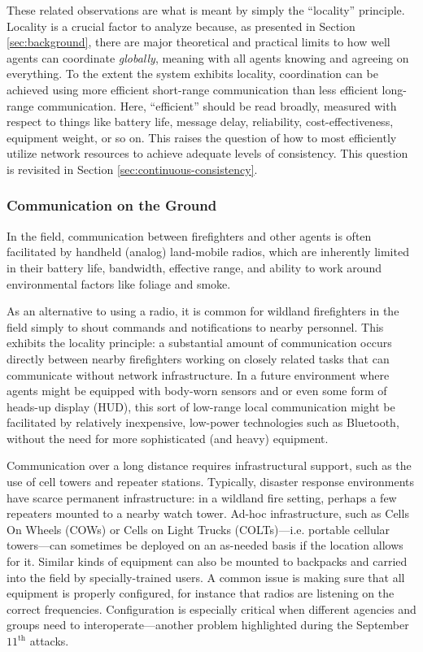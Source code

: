 \documentclass[]             %
{NASA}                       %
\theoremstyle{definition}
\begin{document}
These related observations are what is meant by simply the
``locality'' principle. Locality is a crucial factor to analyze
because, as presented in Section \ref{sec:background}, there are major
theoretical and practical limits to how well agents can coordinate
\emph{globally}, meaning with all agents knowing and agreeing on
everything. To the extent the system exhibits locality, coordination
can be achieved using more efficient short-range communication than
less efficient long-range communication. Here, ``efficient'' should be
read broadly, measured with respect to things like battery life,
message delay, reliability, cost-effectiveness, equipment weight, or
so on. This raises the question of how to most efficiently utilize
network resources to achieve adequate levels of consistency. This
question is revisited in Section \ref{sec:continuous-consistency}.

\subsubsection{Communication on the Ground}
\label{sssec:ground-communication}
In the field, communication between firefighters and other agents is
often facilitated by handheld (analog) land-mobile radios, which are
inherently limited in their battery life, bandwidth, effective range,
and ability to work around environmental factors like foliage and
smoke.

As an alternative to using a radio, it is common for wildland
firefighters in the field simply to shout commands and notifications
to nearby personnel. This exhibits the locality principle: a
substantial amount of communication occurs directly between nearby
firefighters working on closely related tasks that can communicate
without network infrastructure. In a future environment where agents
might be equipped with body-worn sensors and or even some form of
heads-up display (HUD), this sort of low-range local communication
might be facilitated by relatively inexpensive, low-power technologies
such as Bluetooth, without the need for more sophisticated (and heavy)
equipment.

Communication over a long distance requires infrastructural support,
such as the use of cell towers and repeater stations. Typically,
disaster response environments have scarce permanent infrastructure:
in a wildland fire setting, perhaps a few repeaters mounted to a
nearby watch tower. Ad-hoc infrastructure, such as Cells On Wheels
(COWs) or Cells on Light Trucks (COLTs)---i.e. portable cellular
towers---can sometimes be deployed on an as-needed basis if the
location allows for it. Similar kinds of equipment can also be mounted
to backpacks and carried into the field by specially-trained users. A
common issue is making sure that all equipment is properly configured,
for instance that radios are listening on the correct
frequencies. Configuration is especially critical when different
agencies and groups need to interoperate---another problem highlighted
during the September $11^\textrm{th}$ attacks.
\end{document}
